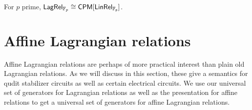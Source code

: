 \begin{corollary}
\label{cor}
For $p$ prime, $\mathsf{Lag}\mathsf{Rel}_{\mathbb{F}_p} \cong \mathsf{CPM}[\sf LinRel_{\mathbb{F}_p}]$.
\end{corollary}

\section{Affine Lagrangian relations}
\label{sec:aff}

Affine Lagrangian relations are perhaps of more practical interest than plain old Lagrangian relations.  As we will discuss in this section, these give a semantics for qudit stabilizer circuits as well as certain electrical circuits.  We use our universal set of generators for Lagrangian relations as well as the presentation for affine relations to get a universal set of generators for affine Lagrangian relations.


